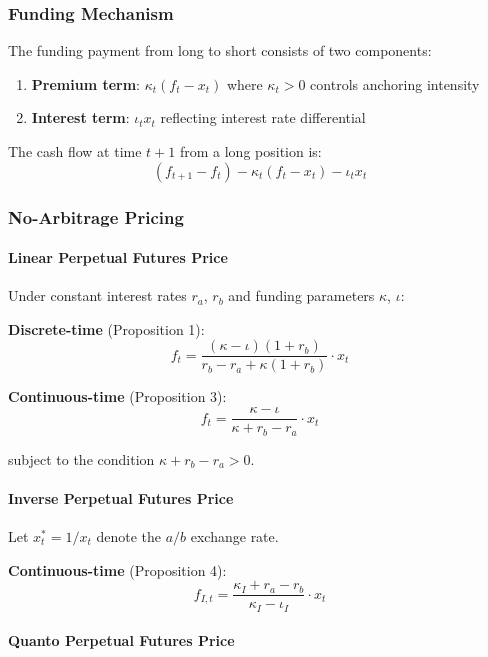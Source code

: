 \subsubsection{Funding Mechanism}

The funding payment from long to short consists of two components:
\begin{enumerate}
  \item \textbf{Premium term}: $\kappa_t(f_t - x_t)$ where $\kappa_t > 0$ controls anchoring intensity
  \item \textbf{Interest term}: $\iota_t x_t$ reflecting interest rate differential
\end{enumerate}

The cash flow at time $t+1$ from a long position is:
\[
(f_{t+1} - f_t) - \kappa_t(f_t - x_t) - \iota_t x_t
\]

\subsubsection{No-Arbitrage Pricing}

\paragraph{Linear Perpetual Futures Price}

Under constant interest rates $r_a$, $r_b$ and funding parameters $\kappa$, $\iota$:

\textbf{Discrete-time} (Proposition 1):
\[
f_t = \frac{(\kappa - \iota)(1 + r_b)}{r_b - r_a + \kappa(1 + r_b)} \cdot x_t
\]

\textbf{Continuous-time} (Proposition 3):
\[
f_t = \frac{\kappa - \iota}{\kappa + r_b - r_a} \cdot x_t
\]

subject to the condition $\kappa + r_b - r_a > 0$.

\paragraph{Inverse Perpetual Futures Price}

Let $x_t^* = 1/x_t$ denote the $a/b$ exchange rate.

\textbf{Continuous-time} (Proposition 4):
\[
f_{I,t} = \frac{\kappa_I + r_a - r_b}{\kappa_I - \iota_I} \cdot x_t
\]

\paragraph{Quanto Perpetual Futures Price}

